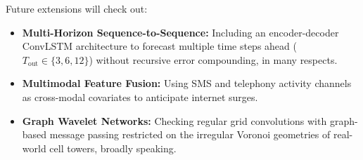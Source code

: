 \documentclass[conference]{IEEEtran}
\begin{document}
Future extensions will check out:
\begin{itemize}
    \item \textbf{Multi-Horizon Sequence-to-Sequence:} Including an encoder-decoder ConvLSTM architecture to forecast multiple time steps ahead ($T_{\text{out}} \in \{3, 6, 12\}$) without recursive error compounding, in many respects.
    \item \textbf{Multimodal Feature Fusion:} Using SMS and telephony activity channels as cross-modal covariates to anticipate internet surges.
    \item \textbf{Graph Wavelet Networks:} Checking regular grid convolutions with graph-based message passing restricted on the irregular Voronoi geometries of real-world cell towers, broadly speaking.
\end{itemize}
\end{document}
